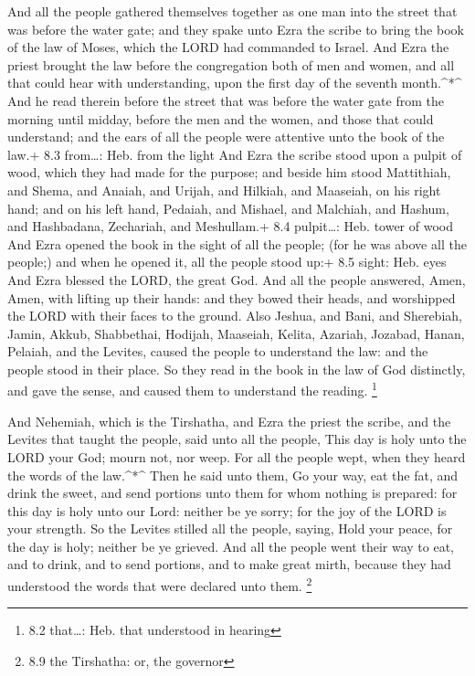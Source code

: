  And all the people gathered themselves together as one man
into the street that was before the water gate; and they spake unto Ezra
the scribe to bring the book of the law of Moses, which the LORD had
commanded to Israel.  And Ezra the priest brought the law
before the congregation both of men and women, and all that could hear
with understanding, upon the first day of the seventh month.\^{}*\^{}
 And he read therein before the street that was before the
water gate from the morning until midday, before the men and the women,
and those that could understand; and the ears of all the people were
attentive unto the book of the law.+ 8.3 from\ldots: Heb. from the light
 And Ezra the scribe stood upon a pulpit of wood, which they
had made for the purpose; and beside him stood Mattithiah, and Shema,
and Anaiah, and Urijah, and Hilkiah, and Maaseiah, on his right hand;
and on his left hand, Pedaiah, and Mishael, and Malchiah, and Hashum,
and Hashbadana, Zechariah, and Meshullam.+ 8.4 pulpit\ldots: Heb. tower
of wood  And Ezra opened the book in the sight of all the
people; (for he was above all the people;) and when he opened it, all
the people stood up:+ 8.5 sight: Heb. eyes  And Ezra blessed
the LORD, the great God. And all the people answered, Amen, Amen, with
lifting up their hands: and they bowed their heads, and worshipped the
LORD with their faces to the ground.  Also Jeshua, and Bani,
and Sherebiah, Jamin, Akkub, Shabbethai, Hodijah, Maaseiah, Kelita,
Azariah, Jozabad, Hanan, Pelaiah, and the Levites, caused the people to
understand the law: and the people stood in their place.  So
they read in the book in the law of God distinctly, and gave the sense,
and caused them to understand the reading. \footnote{8.2 that\ldots:
  Heb. that understood in hearing}

 And Nehemiah, which is the Tirshatha, and Ezra the priest
the scribe, and the Levites that taught the people, said unto all the
people, This day is holy unto the LORD your God; mourn not, nor weep.
For all the people wept, when they heard the words of the law.\^{}*\^{}
 Then he said unto them, Go your way, eat the fat, and
drink the sweet, and send portions unto them for whom nothing is
prepared: for this day is holy unto our Lord: neither be ye sorry; for
the joy of the LORD is your strength.  So the Levites
stilled all the people, saying, Hold your peace, for the day is holy;
neither be ye grieved.  And all the people went their way
to eat, and to drink, and to send portions, and to make great mirth,
because they had understood the words that were declared unto them.
\footnote{8.9 the Tirshatha: or, the governor}

